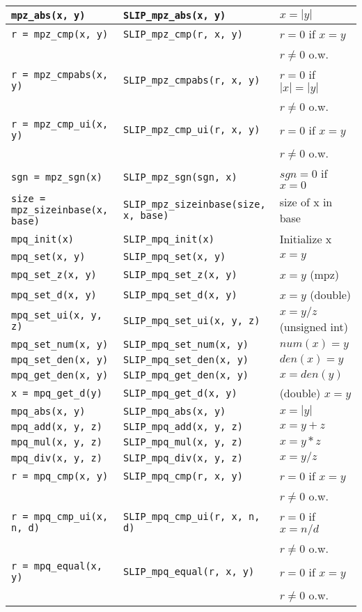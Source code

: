 \documentclass[11pt]{article}
\theoremstyle{definition}
\begin{document}
\begin{table*}[htbp]
\begin{center}
\begin{tabular}{|l|l|l|}
\verb|mpz_abs(x, y)| & \verb|SLIP_mpz_abs(x, y)| & $x = |y|$ \\ \hline
\verb|r = mpz_cmp(x, y)| & \verb|SLIP_mpz_cmp(r, x, y)| & $r = 0$ if $x=y$\\&& $r\neq 0$ o.w. \\ \hline
\verb|r = mpz_cmpabs(x, y)| & \verb|SLIP_mpz_cmpabs(r, x, y)| & $r = 0$ if $|x|=|y|$\\&&  $r\neq 0$ o.w.\\ \hline
\verb|r = mpz_cmp_ui(x, y)| & \verb|SLIP_mpz_cmp_ui(r, x, y)| & $r = 0$ if $x=y$\\&&  $r\neq 0$ o.w. \\ \hline
\verb|sgn = mpz_sgn(x)| & \verb|SLIP_mpz_sgn(sgn, x)| & $sgn = 0$ if $x = 0$ \\ \hline
\verb|size = mpz_sizeinbase(x, base)| & \verb|SLIP_mpz_sizeinbase(size, x, base)| & size of x in base \\ \hline
\verb|mpq_init(x)| & \verb|SLIP_mpq_init(x)| & Initialize x \\ \hline
\verb|mpq_set(x, y)| & \verb|SLIP_mpq_set(x, y)| & $x = y$ \\ \hline
\verb|mpq_set_z(x, y)| & \verb|SLIP_mpq_set_z(x, y)| & $x = y$ (mpz) \\ \hline
\verb|mpq_set_d(x, y)| & \verb|SLIP_mpq_set_d(x, y)| & $x=y$ (double) \\ \hline
\verb|mpq_set_ui(x, y, z)| & \verb|SLIP_mpq_set_ui(x, y, z)| & $x = y/z$ (unsigned int) \\ \hline
\verb|mpq_set_num(x, y)| & \verb|SLIP_mpq_set_num(x, y)| & $num(x) = y$ \\ \hline
\verb|mpq_set_den(x, y)| & \verb|SLIP_mpq_set_den(x, y)| & $den(x) = y$ \\ \hline
\verb|mpq_get_den(x, y)| & \verb|SLIP_mpq_get_den(x, y)| & $x = den(y)$ \\ \hline
\verb|x = mpq_get_d(y)| & \verb|SLIP_mpq_get_d(x, y)| & (double) $x = y$ \\ \hline
\verb|mpq_abs(x, y)| & \verb|SLIP_mpq_abs(x, y)| & $x = |y|$ \\ \hline
\verb|mpq_add(x, y, z)| & \verb|SLIP_mpq_add(x, y, z)| & $x = y+z$ \\ \hline
\verb|mpq_mul(x, y, z)| & \verb|SLIP_mpq_mul(x, y, z)| & $x = y*z$ \\ \hline
\verb|mpq_div(x, y, z)| & \verb|SLIP_mpq_div(x, y, z)| & $x = y/z$ \\ \hline
\verb|r = mpq_cmp(x, y)| & \verb|SLIP_mpq_cmp(r, x, y)| & $r = 0$ if $x=y$\\&&  $r\neq 0$ o.w. \\ \hline
\verb|r = mpq_cmp_ui(x, n, d)| & \verb|SLIP_mpq_cmp_ui(r, x, n, d)| & $r = 0$ if $x=n/d$\\&& $r\neq 0$ o.w. \\ \hline
\verb|r = mpq_equal(x, y)| & \verb|SLIP_mpq_equal(r, x, y)| & $r = 0$ if $x=y$\\&&  $r\neq 0$ o.w. \\ \hline
\end{tabular}
\end{center}
\end{table*}
\newpage
\end{document}
